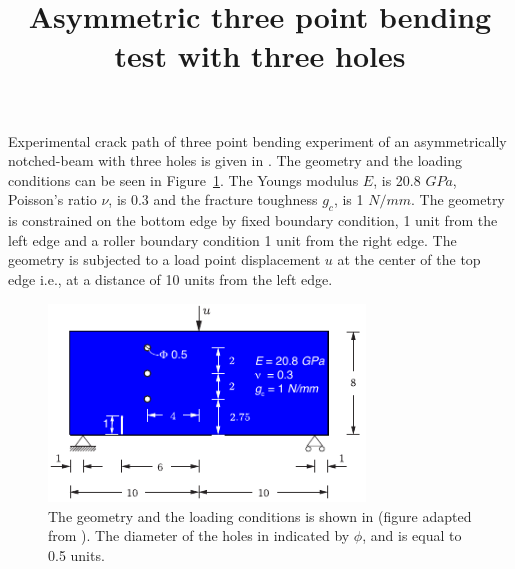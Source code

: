 \documentclass[11pt] {article}
\begin{document}
\title{Asymmetric three point bending test with three holes}
\maketitle
Experimental crack path of three point bending experiment of an asymmetrically notched-beam with three holes is given in \cite{bittencourt1996quasi}. The geometry and the loading conditions can be seen in Figure~\ref{Fig1}. The Youngs modulus $E$, is 20.8 $GPa$, Poisson's ratio $\nu$, is 0.3 and the fracture toughness $g_c$, is 1 $N/mm$. The geometry is constrained on the bottom edge by fixed boundary condition, 1 unit from the left edge and a roller boundary condition 1 unit from the right edge. The geometry is subjected to a load point displacement $u$ at the center of the top edge i.e., at a distance of 10 units from the left edge. 
\begin{figure}[ht!]
	\centering
	\includegraphics[width=0.75\textwidth]{3_hole_bend.pdf}
	\caption{The geometry and the loading conditions is shown in (figure adapted from \cite{miehe2010phase}). The diameter of the holes in indicated by $\phi$, and is equal to 0.5 units.}
	\label{Fig1}
\end{figure}



%
\end{document}

